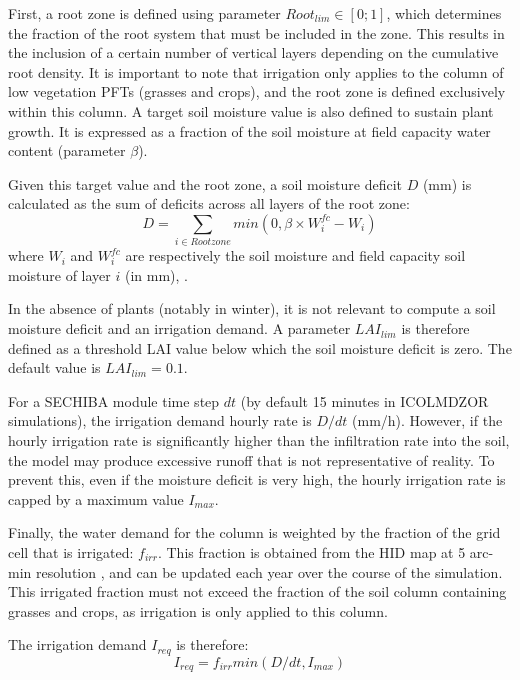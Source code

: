 First, a root zone is defined using parameter $Root_{lim} \in [0;1]$, which determines the fraction of the root system that must be included in the zone. This results in the inclusion of a certain number of vertical layers depending on the cumulative root density. It is important to note that irrigation only applies to the column of low vegetation PFTs (grasses and crops), and the root zone is defined exclusively within this column.
A target soil moisture value is also defined to sustain plant growth. It is expressed as a fraction of the soil moisture at field capacity water content (parameter $\beta$).

Given this target value and the root zone, a soil moisture deficit $D$ (mm) is calculated as the sum of deficits across all layers of the root zone:
\begin{equation}
    D = \sum_{i \in Rootzone} min(0,\beta \times W_i^{fc} - W_i)
\end{equation}
where $W_i$ and $W_i^{fc}$ are respectively the soil moisture and field capacity soil moisture of layer $i$ (in mm), .

In the absence of plants (notably in winter), it is not relevant to compute a soil moisture deficit and an irrigation demand. A parameter $LAI_{lim}$ is therefore defined as a threshold LAI value below which the soil moisture deficit is zero. The default value is $LAI_{lim}=0.1$.

For a SECHIBA module time step $dt$ (by default 15 minutes in ICOLMDZOR simulations), the irrigation demand hourly rate is $D/dt$ (mm/h). However, if the hourly irrigation rate is significantly higher than the infiltration rate into the soil, the model may produce excessive runoff that is not representative of reality. To prevent this, even if the moisture deficit is very high, the hourly irrigation rate is capped by a maximum value $I_{max}$.

Finally, the water demand for the column is weighted by the fraction of the grid cell that is irrigated: $f_{irr}$. This fraction is obtained from the HID map at 5 arc-min resolution \citep{siebert_quantifying_2010}, and can be updated each year over the course of the simulation.
This irrigated fraction must not exceed the fraction of the soil column containing grasses and crops, as irrigation is only applied to this column.

The irrigation demand $I_{req}$ is therefore:
\begin{equation}
    I_{req} = f_{irr} min(D/dt, I_{max})
\end{equation}

